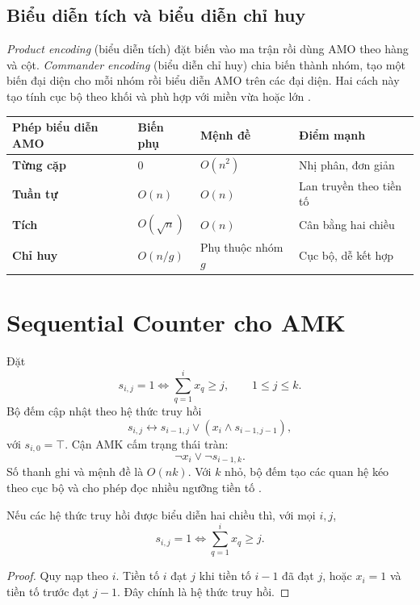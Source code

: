 \subsection{Biểu diễn tích và biểu diễn chỉ huy}

\emph{Product encoding} (biểu diễn tích) đặt biến vào ma trận rồi dùng AMO theo
hàng và cột. \emph{Commander encoding} (biểu diễn chỉ huy) chia biến thành nhóm,
tạo một biến đại diện cho mỗi nhóm rồi biểu diễn AMO trên các đại diện. Hai cách
này tạo tính cục bộ theo khối và phù hợp với miền vừa hoặc lớn
\parencite{chen2010amo}.

\begin{center}
\label{tab:amo-encoders}
\begin{tabularx}{\textwidth}{@{}>{\bfseries\sffamily}p{}YYY@{}}
\toprule
Phép biểu diễn AMO & Biến phụ & Mệnh đề & Điểm mạnh\\
\midrule
Từng cặp & \(0\) & \(O(n^2)\) & Nhị phân, đơn giản\\
Tuần tự & \(O(n)\) & \(O(n)\) & Lan truyền theo tiền tố\\
Tích & \(O(\sqrt n)\) & \(O(n)\) & Cân bằng hai chiều\\
Chỉ huy & \(O(n/g)\) & Phụ thuộc nhóm \(g\) & Cục bộ, dễ kết hợp\\
\bottomrule
\end{tabularx}
\end{center}

\section{Sequential Counter cho AMK}

Đặt
\[
  s_{i,j}=1
  \iff
  \sum_{q=1}^{i}x_q\ge j,
  \qquad 1\le j\le k.
\]
Bộ đếm cập nhật theo hệ thức truy hồi
\[
  s_{i,j}
  \leftrightarrow
  s_{i-1,j}\lor(x_i\land s_{i-1,j-1}),
\]
với \(s_{i,0}=\top\). Cận AMK cấm trạng thái tràn:
\[
  \neg x_i\lor\neg s_{i-1,k}.
\]
Số thanh ghi và mệnh đề là \(O(nk)\). Với \(k\) nhỏ, bộ đếm tạo các quan hệ
kéo theo cục bộ và cho phép đọc nhiều ngưỡng tiền tố
\parencite{sinz2005cardinality}.

\begin{proposition}
Nếu các hệ thức truy hồi được biểu diễn hai chiều thì, với mọi \(i,j\),
\[
  s_{i,j}=1\iff\sum_{q=1}^{i}x_q\ge j.
\]
\end{proposition}

\begin{proof}
Quy nạp theo \(i\). Tiền tố \(i\) đạt \(j\) khi tiền tố \(i-1\) đã đạt \(j\),
hoặc \(x_i=1\) và tiền tố trước đạt \(j-1\). Đây chính là hệ thức truy hồi.
\end{proof}


